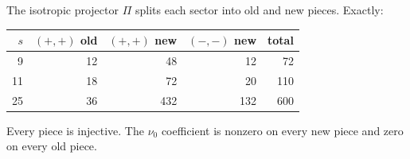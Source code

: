\begin{proposition}\label{prop:psq5}
The isotropic projector $\Pi$ splits each sector into old and new pieces. Exactly:
\begin{center}\small\begin{tabular}{rrrrr}\toprule $s$&$(+,+)$ old&$(+,+)$ new&$(-,-)$ new&total\\\midrule 9&12&48&12&72\\ 11&18&72&20&110\\ 25&36&432&132&600\\\bottomrule\end{tabular}\end{center}
Every piece is injective. The $\nu_0$ coefficient is nonzero on every new piece and zero on every old piece.
\end{proposition}

